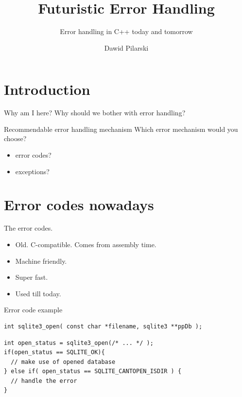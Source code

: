 \documentclass[10pt]{beamer}
\title{Futuristic Error Handling}
\subtitle{Error handling in C++ today and tomorrow}
\date{}
\author{Dawid Pilarski}
\institute{dawid.pilarski@panicsofware.com}
\begin{document}
\maketitle


\section{Introduction}

\begin{frame}{Why am I here?}
	Why should we bother with error handling?

\end{frame}


\begin{frame}{Recommendable error handling mechanism}
	Which error mechanism would you choose?
	
	\begin{itemize}
		\item error codes?
		\item exceptions?
	\end{itemize}
\end{frame}

\section{Error codes nowadays}
\begin{frame}{The error codes.}
	\begin{itemize}[<+- | alert@+>]
		\item Old. C-compatible. Comes from assembly time.
		\item Machine friendly.
		\item Super fast.
		\item Used till today.
	\end{itemize}
\end{frame}

\begin{frame}[fragile]{Error code example}
	\begin{verbatim}
int sqlite3_open( const char *filename, sqlite3 **ppDb );
	\end{verbatim}
	
	\pause
	
	\hrulefill
	
	\begin{verbatim}
int open_status = sqlite3_open(/* ... */ );
if(open_status == SQLITE_OK){
  // make use of opened database
} else if( open_status == SQLITE_CANTOPEN_ISDIR ) {
  // handle the error
}
	\end{verbatim}
	
\end{frame}
\end{document}
